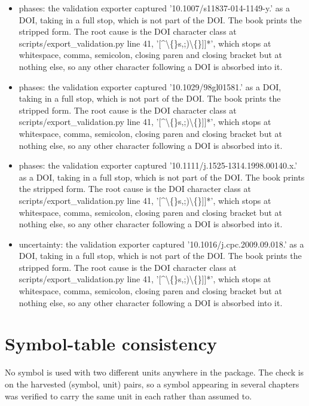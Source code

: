 \documentclass[10pt,a4paper,twoside]{report}
\begin{document}
\begin{itemize}
\item phases: the validation exporter captured '10.1007/s11837-014-1149-y.' as a DOI, taking in a full stop, which is not part of the DOI. The book prints the stripped form. The root cause is the DOI character class at scripts/export\_validation.py line 41, '[\textasciicircum{}\textbackslash\{\}s,;)\textbackslash\{\}]]*', which stops at whitespace, comma, semicolon, closing paren and closing bracket but at nothing else, so any other character following a DOI is absorbed into it.

\item phases: the validation exporter captured '10.1029/98gl01581.' as a DOI, taking in a full stop, which is not part of the DOI. The book prints the stripped form. The root cause is the DOI character class at scripts/export\_validation.py line 41, '[\textasciicircum{}\textbackslash\{\}s,;)\textbackslash\{\}]]*', which stops at whitespace, comma, semicolon, closing paren and closing bracket but at nothing else, so any other character following a DOI is absorbed into it.

\item phases: the validation exporter captured '10.1111/j.1525-1314.1998.00140.x.' as a DOI, taking in a full stop, which is not part of the DOI. The book prints the stripped form. The root cause is the DOI character class at scripts/export\_validation.py line 41, '[\textasciicircum{}\textbackslash\{\}s,;)\textbackslash\{\}]]*', which stops at whitespace, comma, semicolon, closing paren and closing bracket but at nothing else, so any other character following a DOI is absorbed into it.

\item uncertainty: the validation exporter captured '10.1016/j.cpc.2009.09.018.' as a DOI, taking in a full stop, which is not part of the DOI. The book prints the stripped form. The root cause is the DOI character class at scripts/export\_validation.py line 41, '[\textasciicircum{}\textbackslash\{\}s,;)\textbackslash\{\}]]*', which stops at whitespace, comma, semicolon, closing paren and closing bracket but at nothing else, so any other character following a DOI is absorbed into it.

\end{itemize}

\section{Symbol-table consistency}

No symbol is used with two different units anywhere in the package. The check is on the harvested (symbol, unit) pairs, so a symbol appearing in several chapters was verified to carry the same unit in each rather than assumed to.
\end{document}
